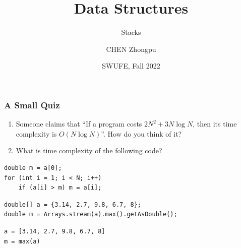 \documentclass[aspectratio=169, 14pt]{beamer}
\title[Data Structures] %
{Data Structures}
\subtitle{Stacks}
\author[CHEN Zhongpu] %
{CHEN Zhongpu}
\institute[] %
{
  School of Computing and Artificial Intelligence \\
  \href{mailto:zpchen@swufe.edu.cn}{zpchen@swufe.edu.cn}
}
\date[] %
{SWUFE, Fall 2022}
\begin{document}
\frame{\titlepage}

\begin{frame}[fragile]
    \frametitle{A Small Quiz}
    \begin{enumerate}
        \item Someone claims that ``If a program costs \(2N^2 + 3N\log{N}\), then its time complexity is $O(N\log{N})$''. How do you think of it?
        \item What is time complexity of the following code?
    \end{enumerate}

\begin{verbatim}
double m = a[0];
for (int i = 1; i < N; i++)
    if (a[i] > m) m = a[i];
\end{verbatim}  

\end{frame}

\begin{frame}[fragile]
    \begin{verbatim}
double[] a = {3.14, 2.7, 9.8, 6.7, 8};
double m = Arrays.stream(a).max().getAsDouble();
    \end{verbatim}  

\begin{verbatim}
a = [3.14, 2.7, 9.8, 6.7, 8]
m = max(a)
\end{verbatim} 

\end{frame}
\end{document}
